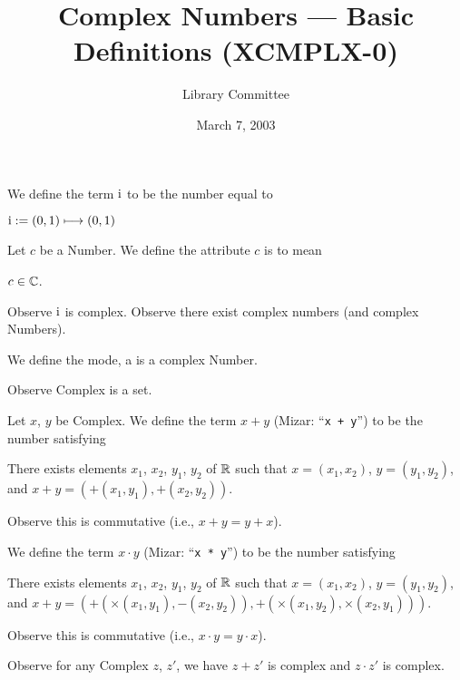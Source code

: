 \documentclass{article}
\title{Complex Numbers --- Basic Definitions (XCMPLX-0)}
\author{Library Committee}
\date{March 7, 2003}
\begin{document}
\maketitle

\begin{definition}
We define the term $\mathrm{i}$ to be the number equal to
\begin{defn}
\item $\mathrm{i} := (0,1)\longmapsto(0,1)$
\end{defn}
Let $c$ be a Number.
We define the attribute $c$ is  to mean
\begin{defn}
\item $c\in\mathbb{C}$.
\end{defn}
\end{definition}

Observe $\mathrm{i}$ is complex. Observe there exist complex numbers (and
complex Numbers).

\begin{definition}
We define the mode, a  is a complex Number.
\end{definition}

Observe Complex is a set.

\skipdefn

\begin{definition}
Let $x$, $y$ be Complex.
We define the term $x + y$ (Mizar: ``\verb#x + y#'') to be the number satisfying
\begin{defn}[start=4]
\item There exists elements $x_{1}$, $x_{2}$, $y_{1}$, $y_{2}$ of $\mathbb{R}$
  such that $x=(x_{1},x_{2})$, $y=(y_{1},y_{2})$, and $x+y=(+(x_{1},y_{1}),+(x_{2},y_{2}))$.
\end{defn}
Observe this is commutative (i.e., $x+y=y+x$).

We define the term $x\cdot y$ (Mizar: ``\verb#x * y#'') to be the number
satisfying
\begin{defn}
\item There exists elements $x_{1}$, $x_{2}$, $y_{1}$, $y_{2}$ of $\mathbb{R}$
  such that $x=(x_{1},x_{2})$, $y=(y_{1},y_{2})$, and $x+y=(+(\times(x_{1},y_{1}),-(x_{2},y_{2})),+(\times(x_{1},y_{2}),\times(x_{2},y_{1})))$.
\end{defn}
Observe this is commutative (i.e., $x\cdot y=y\cdot x$).
\end{definition}

Observe for any Complex $z$, $z'$, we have $z+z'$ is complex and $z\cdot z'$
is complex.
\end{document}
